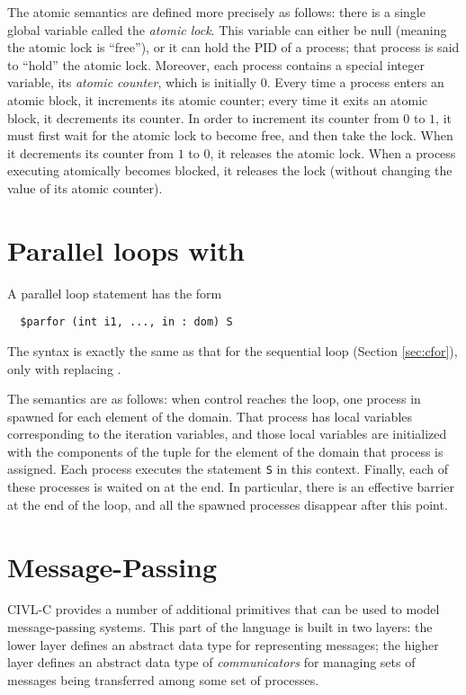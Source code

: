 The atomic semantics are defined more precisely as follows: there is a
single global variable called the \emph{atomic lock}. This variable
can either be null (meaning the atomic lock is ``free''), or it can
hold the PID of a process; that process is said to ``hold'' the atomic
lock.  Moreover, each process contains a special integer variable, its
\emph{atomic counter}, which is initially 0.  Every time a process
enters an atomic block, it increments its atomic counter; every time
it exits an atomic block, it decrements its counter.  In order to
increment its counter from $0$ to $1$, it must first wait for the
atomic lock to become free, and then take the lock.  When it
decrements its counter from $1$ to $0$, it releases the atomic lock.
When a process executing atomically becomes blocked, it releases the
lock (without changing the value of its atomic counter).

\section{Parallel loops with \cparfor}
\label{sec:parfor}

A parallel loop statement has the form
\begin{verbatim}
  $parfor (int i1, ..., in : dom) S
\end{verbatim}
The syntax is exactly the same as that for the sequential loop \cfor
(Section \ref{sec:cfor}), only with \cparfor{} replacing \cfor.

The semantics are as follows: when control reaches the loop, one
process in spawned for each element of the domain.  That process has
local variables corresponding to the iteration variables, and those
local variables are initialized with the components of the tuple for
the element of the domain that process is assigned.  Each process
executes the statement \texttt{S} in this context.  Finally, each of
these processes is waited on at the end.  In particular, there is an
effective barrier at the end of the loop, and all the spawned
processes disappear after this point.

\section{Message-Passing}

CIVL-C provides a number of additional primitives that can be used to
model message-passing systems.  This part of the language is built in
two layers: the lower layer defines an abstract data type for
representing messages; the higher layer defines an abstract data type
of \emph{communicators} for managing sets of messages being
transferred among some set of processes.

